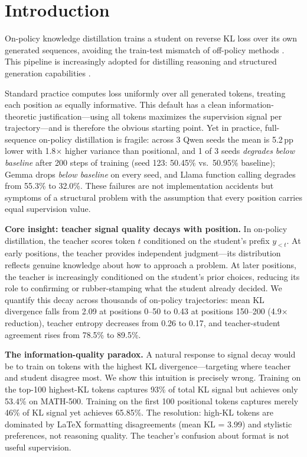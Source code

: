 \documentclass[10pt]{article}
\begin{document}
\section{Introduction}
\label{sec:intro}

On-policy knowledge distillation trains a student on reverse KL loss over its own generated sequences, avoiding the train-test mismatch of off-policy methods \citep{agarwal2024onpolicy, gu2024minillm}.
This pipeline is increasingly adopted for distilling reasoning \citep{deepseekr1, chen2025distillingessence} and structured generation capabilities \citep{xu2024survey}.

Standard practice computes loss uniformly over all generated tokens, treating each position as equally informative.
This default has a clean information-theoretic justification---using all tokens maximizes the supervision signal per trajectory---and is therefore the obvious starting point.
Yet in practice, full-sequence on-policy distillation is fragile: across 3 Qwen seeds the mean is 5.2\,pp lower with 1.8$\times$ higher variance than positional, and 1 of 3 seeds \emph{degrades below baseline} after 200 steps of training (seed 123: 50.45\% vs.\ 50.95\% baseline); Gemma drops \emph{below baseline} on every seed, and Llama function calling degrades from 55.3\% to 32.0\%.
These failures are not implementation accidents but symptoms of a structural problem with the assumption that every position carries equal supervision value.

\textbf{Core insight: teacher signal quality decays with position.}
In on-policy distillation, the teacher scores token $t$ conditioned on the student's prefix $y_{<t}$.
At early positions, the teacher provides independent judgment---its distribution reflects genuine knowledge about how to approach a problem.
At later positions, the teacher is increasingly conditioned on the student's prior choices, reducing its role to confirming or rubber-stamping what the student already decided.
We quantify this decay across thousands of on-policy trajectories: mean KL divergence falls from 2.09 at positions 0--50 to 0.43 at positions 150--200 (4.9$\times$ reduction), teacher entropy decreases from 0.26 to 0.17, and teacher-student agreement rises from 78.5\% to 89.5\%.

\textbf{The information-quality paradox.}
A natural response to signal decay would be to train on tokens with the highest KL divergence---targeting where teacher and student disagree most.
We show this intuition is precisely wrong.
Training on the top-100 highest-KL tokens captures 93\% of total KL signal but achieves only 53.4\% on MATH-500.
Training on the first 100 positional tokens captures merely 46\% of KL signal yet achieves 65.85\%.
The resolution: high-KL tokens are dominated by LaTeX formatting disagreements (mean KL = 3.99) and stylistic preferences, not reasoning quality.
The teacher's confusion about format is not useful supervision.
\end{document}
